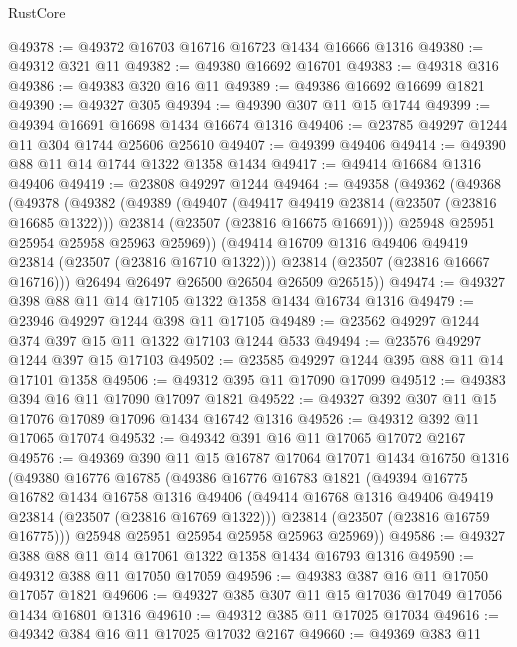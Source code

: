 \begin{lexlean}{RustCore}
\begin{coremodule}
@49378 := @49372 @16703 @16716 @16723 @1434 @16666 @1316
@49380 := @49312 @321 @11
@49382 := @49380 @16692 @16701
@49383 := @49318 @316
@49386 := @49383 @320 @16 @11
@49389 := @49386 @16692 @16699 @1821
@49390 := @49327 @305
@49394 := @49390 @307 @11 @15 @1744
@49399 := @49394 @16691 @16698 @1434 @16674 @1316
@49406 := @23785 @49297 @1244 @11 @304 @1744 @25606 @25610
@49407 := @49399 @49406
@49414 := @49390 @88 @11 @14 @1744 @1322 @1358 @1434
@49417 := @49414 @16684 @1316 @49406
@49419 := @23808 @49297 @1244
@49464 := @49358
    (@49362
      (@49368
        (@49378
          (@49382
            (@49389
              (@49407
                (@49417 @49419 @23814 (@23507 (@23816 @16685 @1322)))
                @23814
                (@23507 (@23816 @16675 @16691)))
              @25948
              @25951
              @25954
              @25958
              @25963
              @25969))
          (@49414 @16709 @1316 @49406 @49419 @23814 (@23507 (@23816 @16710 @1322)))
          @23814
          (@23507 (@23816 @16667 @16716)))
        @26494
        @26497
        @26500
        @26504
        @26509
        @26515))
@49474 := @49327 @398 @88 @11 @14 @17105 @1322 @1358 @1434 @16734 @1316
@49479 := @23946 @49297 @1244 @398 @11 @17105
@49489 := @23562 @49297 @1244 @374 @397 @15 @11 @1322 @17103 @1244 @533
@49494 := @23576 @49297 @1244 @397 @15 @17103
@49502 := @23585 @49297 @1244 @395 @88 @11 @14 @17101 @1358
@49506 := @49312 @395 @11 @17090 @17099
@49512 := @49383 @394 @16 @11 @17090 @17097 @1821
@49522 := @49327 @392 @307 @11 @15 @17076 @17089 @17096 @1434 @16742 @1316
@49526 := @49312 @392 @11 @17065 @17074
@49532 := @49342 @391 @16 @11 @17065 @17072 @2167
@49576 := @49369
    @390
    @11
    @15
    @16787
    @17064
    @17071
    @1434
    @16750
    @1316
    (@49380
      @16776
      @16785
      (@49386
        @16776
        @16783
        @1821
        (@49394
          @16775
          @16782
          @1434
          @16758
          @1316
          @49406
          (@49414 @16768 @1316 @49406 @49419 @23814 (@23507 (@23816 @16769 @1322)))
          @23814
          (@23507 (@23816 @16759 @16775)))
        @25948
        @25951
        @25954
        @25958
        @25963
        @25969))
@49586 := @49327 @388 @88 @11 @14 @17061 @1322 @1358 @1434 @16793 @1316
@49590 := @49312 @388 @11 @17050 @17059
@49596 := @49383 @387 @16 @11 @17050 @17057 @1821
@49606 := @49327 @385 @307 @11 @15 @17036 @17049 @17056 @1434 @16801 @1316
@49610 := @49312 @385 @11 @17025 @17034
@49616 := @49342 @384 @16 @11 @17025 @17032 @2167
@49660 := @49369
    @383
    @11

\end{coremodule}
\end{lexlean}
